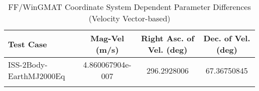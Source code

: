\begin{table}[htbp!]
\centering
\caption{ FF/WinGMAT Coordinate System Dependent Parameter Differences (Velocity Vector-based)}
      \begin{tabular}{lccc}
      \hline\hline
          Test Case & Mag-Vel (m/s) & Right Asc. of Vel. (deg) & Dec. of Vel. (deg) \\
         \hline
         ISS-2Body-EarthMJ2000Eq & 4.860067904e-007 & 296.2928006 & 67.36750845 \\
      \hline\hline
      \label{Table: FF-WinGMAT CS Parameters Set 4} 
\end{tabular}
\end{table}
